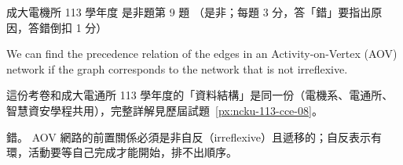 \begin{pastexam}[label={px:ncku-113-ee-08}]{成大電機所 113 學年度 是非題第 9 題}
（是非；每題 3 分，答「錯」要指出原因，答錯倒扣 1 分）

We can find the precedence relation of the edges in an Activity-on-Vertex (AOV) network if the
graph corresponds to the network that is not irreflexive.
\end{pastexam}

\begin{pastsoln}
這份考卷和成大電通所 113 學年度的「資料結構」是同一份（電機系、電通所、智慧資安學程共用），完整詳解見歷屆試題~\ref{px:ncku-113-cce-08}。

錯。 AOV 網路的前置關係必須是非自反（irreflexive）且遞移的；自反表示有環，活動要等自己完成才能開始，排不出順序。
\end{pastsoln}
